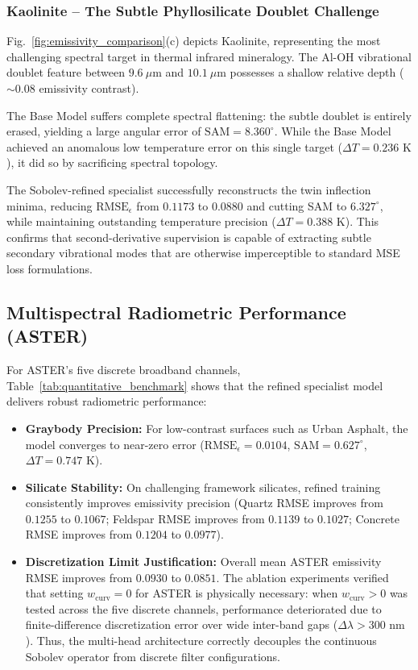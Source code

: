 \documentclass[journal]{IEEEtran}
\begin{document}
\subsubsection{Kaolinite -- The Subtle Phyllosilicate Doublet Challenge}
Fig.~\ref{fig:emissivity_comparison}(c) depicts Kaolinite, representing the most challenging spectral target in thermal infrared mineralogy. The Al-OH vibrational doublet feature between $9.6\ \mu\text{m}$ and $10.1\ \mu\text{m}$ possesses a shallow relative depth ($\sim 0.08$ emissivity contrast). 

The Base Model suffers complete spectral flattening: the subtle doublet is entirely erased, yielding a large angular error of $\text{SAM} = 8.360^\circ$. While the Base Model achieved an anomalous low temperature error on this single target ($\Delta T = 0.236\text{ K}$), it did so by sacrificing spectral topology.

The Sobolev-refined specialist successfully reconstructs the twin inflection minima, reducing $\text{RMSE}_\epsilon$ from $0.1173$ to $0.0880$ and cutting SAM to $6.327^\circ$, while maintaining outstanding temperature precision ($\Delta T = 0.388\text{ K}$). This confirms that second-derivative supervision is capable of extracting subtle secondary vibrational modes that are otherwise imperceptible to standard MSE loss formulations.

\subsection{Multispectral Radiometric Performance (ASTER)}
For ASTER's five discrete broadband channels, Table~\ref{tab:quantitative_benchmark} shows that the refined specialist model delivers robust radiometric performance:
\begin{itemize}
    \item \textbf{Graybody Precision:} For low-contrast surfaces such as Urban Asphalt, the model converges to near-zero error ($\text{RMSE}_\epsilon = 0.0104$, $\text{SAM} = 0.627^\circ$, $\Delta T = 0.747\text{ K}$).
    \item \textbf{Silicate Stability:} On challenging framework silicates, refined training consistently improves emissivity precision (Quartz RMSE improves from $0.1255$ to $0.1067$; Feldspar RMSE improves from $0.1139$ to $0.1027$; Concrete RMSE improves from $0.1204$ to $0.0977$).
    \item \textbf{Discretization Limit Justification:} Overall mean ASTER emissivity RMSE improves from $0.0930$ to $0.0851$. The ablation experiments verified that setting $w_{\text{curv}} = 0$ for ASTER is physically necessary: when $w_{\text{curv}} > 0$ was tested across the five discrete channels, performance deteriorated due to finite-difference discretization error over wide inter-band gaps ($\Delta \lambda > 300\text{ nm}$). Thus, the multi-head architecture correctly decouples the continuous Sobolev operator from discrete filter configurations.
\end{itemize}
\end{document}
